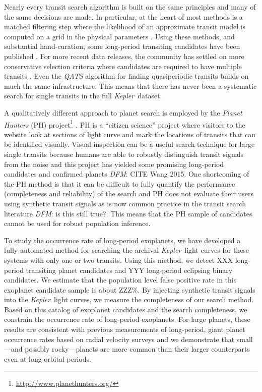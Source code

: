 \documentclass[12pt,preprint]{aastex}
\newcommand{\project}[1]{\textsl{#1}}
\newcommand{\kepler}{\project{Kepler}}
\newcommand{\todo}[3]{{\color{#2}\emph{#1}: #3}}
\newcommand{\dfmtodo}[1]{\todo{DFM}{red}{#1}}
\begin{document}
Nearly every transit search algorithm is built on the same principles and many
of the same decisions are made.
In particular, at the heart of most methods is a matched filtering step where
the likelihood of an approximate transit model is computed on a grid in the
physical parameters \citep[\kepler\ Data Processing
Handbook\footnote{\url{https://archive.stsci.edu/kepler/manuals/KSCI-19081-001_Data_Processing_Handbook.pdf}};][]{%
Petigura:2013, Huang:2013, Dressing:2015, Foreman-Mackey:2015}.
Using these methods, and substantial hand-curation, some long-period
transiting candidates have been published \citep[for example][]{Batalha:2013,
Huang:2013, Kipping:2014a}.
For more recent data releases, the community has settled on more conservative
selection criteria where candidates are required to have multiple transits
\citep[for example][]{Petigura:2013, Burke:2014, Rowe:2015}.
Even the \project{QATS} algorithm \citep{Carter:2013} for finding
quasiperiodic transits builds on much the same infrastructure.
This means that there has never been a systematic search for single transits
in the full \kepler\ dataset.

A qualitatively different approach to planet search is employed by the
\project{Planet Hunters} (PH)
project\footnote{\url{http://www.planethunters.org/}} \citep{Fischer:2012}.
PH is a ``citizen science'' project where visitors to the website look at
sections of light curve and mark the locations of transits that can be
identified visually.
Visual inspection can be a useful search technique for large single transits
because humans are able to robustly distinguish transit signals from the noise
and this project has yielded some promising long-period candidates and
confirmed planets \citep[for example][]{Wang:2013} \dfmtodo{CITE Wang 2015}.
One shortcoming of the PH method is that it can be difficult to fully quantify
the performance (completeness and reliability) of the search and PH does not
evaluate their users using synthetic transit signals as is now common practice
in the transit search literature \dfmtodo{is this still true?}.
This means that the PH sample of candidates cannot be used for robust
population inference.

To study the occurrence rate of long-period exoplanets, we have developed a
fully-automated method for searching the archival \kepler\ light curves for
these systems with only one or two transits.
Using this method, we detect XXX long-period transiting planet candidates and
YYY long-period eclipsing binary candidates.
We estimate that the population level false positive rate in this exoplanet
candidate sample is about ZZZ\%.
By injecting synthetic transit signals into the \kepler\ light curves, we
measure the completeness of our search method.
Based on this catalog of exoplanet candidates and the search completeness, we
constrain the occurrence rate of long-period exoplanets.
For large planets, these results are consistent with previous measurements of
long-period, giant planet occurrence rates based on radial velocity surveys
and we demonstrate that small---and possibly rocky---planets are more common
than their larger counterparts even at long orbital periods.
\end{document}
